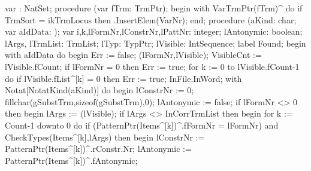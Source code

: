 \nwenddocs{}\endmoddef\nwstartdeflinemarkup{}\nwenddeflinemarkup
var : NatSet;
procedure (var fTrm: TrmPtr);
begin
   with VarTrmPtr(fTrm)^ do
      if TrmSort = ikTrmLocus then .InsertElem(VarNr);
end;
\eatline
{}\nwendcode{}\nwdocspar
\nwenddocs{}\endmoddef\nwstartdeflinemarkup{}\nwenddeflinemarkup
procedure (aKind: char; var aIdData: );
var
   i,k,lFormNr,lConstrNr,lPattNr: integer;
   lAntonymic: boolean;
   lArgs, lTrmList: TrmList;
   lTyp: TypPtr;
   lVisible: IntSequence;
label Found;
begin
   with aIdData do
   begin
      Err := false;
      (lFormNr,lVisible);
      VisibleCnt := lVisible.fCount;
      if lFormNr = 0 then Err := true;
      for k := 0 to lVisible.fCount-1 do
         if lVisible.fList^[k] = 0 then Err := true;
      InFile.InWord;
      with Notat[NotatKind(aKind)]  do
      begin
         lConstrNr := 0;
         fillchar(gSubstTrm,sizeof(gSubstTrm),0);
         lAntonymic := false;
         if lFormNr <> 0 then
         begin
            lArgs := (lVisible);
            if lArgs <> InCorrTrmList then
            begin
               for k := Count-1 downto 0 do
                  if (PatternPtr(Items^[k])^.fFormNr = lFormNr) and
                        CheckTypes(Items^[k],lArgs) then
                  begin
                     lConstrNr := PatternPtr(Items^[k])^.rConstr.Nr;
                     lAntonymic := PatternPtr(Items^[k])^.fAntonymic;
